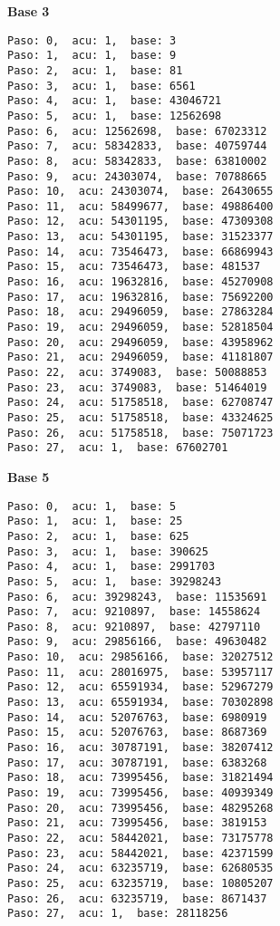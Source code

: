 \documentclass[a4paper]{article}
\begin{document}
\textbf{Base 3}
\begin{verbatim}
Paso: 0,  acu: 1,  base: 3  
Paso: 1,  acu: 1,  base: 9  
Paso: 2,  acu: 1,  base: 81  
Paso: 3,  acu: 1,  base: 6561  
Paso: 4,  acu: 1,  base: 43046721  
Paso: 5,  acu: 1,  base: 12562698  
Paso: 6,  acu: 12562698,  base: 67023312  
Paso: 7,  acu: 58342833,  base: 40759744  
Paso: 8,  acu: 58342833,  base: 63810002  
Paso: 9,  acu: 24303074,  base: 70788665  
Paso: 10,  acu: 24303074,  base: 26430655  
Paso: 11,  acu: 58499677,  base: 49886400  
Paso: 12,  acu: 54301195,  base: 47309308  
Paso: 13,  acu: 54301195,  base: 31523377  
Paso: 14,  acu: 73546473,  base: 66869943  
Paso: 15,  acu: 73546473,  base: 481537  
Paso: 16,  acu: 19632816,  base: 45270908  
Paso: 17,  acu: 19632816,  base: 75692200  
Paso: 18,  acu: 29496059,  base: 27863284  
Paso: 19,  acu: 29496059,  base: 52818504  
Paso: 20,  acu: 29496059,  base: 43958962  
Paso: 21,  acu: 29496059,  base: 41181807  
Paso: 22,  acu: 3749083,  base: 50088853  
Paso: 23,  acu: 3749083,  base: 51464019  
Paso: 24,  acu: 51758518,  base: 62708747  
Paso: 25,  acu: 51758518,  base: 43324625  
Paso: 26,  acu: 51758518,  base: 75071723  
Paso: 27,  acu: 1,  base: 67602701  
\end{verbatim}

\textbf{Base 5}
\begin{verbatim}
Paso: 0,  acu: 1,  base: 5  
Paso: 1,  acu: 1,  base: 25  
Paso: 2,  acu: 1,  base: 625  
Paso: 3,  acu: 1,  base: 390625  
Paso: 4,  acu: 1,  base: 2991703  
Paso: 5,  acu: 1,  base: 39298243  
Paso: 6,  acu: 39298243,  base: 11535691  
Paso: 7,  acu: 9210897,  base: 14558624  
Paso: 8,  acu: 9210897,  base: 42797110  
Paso: 9,  acu: 29856166,  base: 49630482  
Paso: 10,  acu: 29856166,  base: 32027512  
Paso: 11,  acu: 28016975,  base: 53957117  
Paso: 12,  acu: 65591934,  base: 52967279  
Paso: 13,  acu: 65591934,  base: 70302898  
Paso: 14,  acu: 52076763,  base: 6980919  
Paso: 15,  acu: 52076763,  base: 8687369  
Paso: 16,  acu: 30787191,  base: 38207412  
Paso: 17,  acu: 30787191,  base: 6383268  
Paso: 18,  acu: 73995456,  base: 31821494  
Paso: 19,  acu: 73995456,  base: 40939349  
Paso: 20,  acu: 73995456,  base: 48295268  
Paso: 21,  acu: 73995456,  base: 3819153  
Paso: 22,  acu: 58442021,  base: 73175778  
Paso: 23,  acu: 58442021,  base: 42371599  
Paso: 24,  acu: 63235719,  base: 62680535  
Paso: 25,  acu: 63235719,  base: 10805207  
Paso: 26,  acu: 63235719,  base: 8671437  
Paso: 27,  acu: 1,  base: 28118256  
\end{verbatim}
\end{document}
